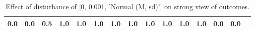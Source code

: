 \begin{table}
\begin{tabular}{l|cc|cc|cc|cc|cc|cc|cc}
\cellcolor{Bittersweet}0.0&\cellcolor{Bittersweet}0.0&0.5&1.0&\cellcolor{Bittersweet}1.0&\cellcolor{Bittersweet}1.0&\cellcolor{Bittersweet}1.0&\cellcolor{Bittersweet}1.0&\cellcolor{Bittersweet}1.0&\cellcolor{Bittersweet}1.0&\cellcolor{Bittersweet}1.0&\cellcolor{Bittersweet}1.0&\cellcolor{Bittersweet}0.0&\cellcolor{Bittersweet}0.0\\\bottomrule\end{tabular}\caption{Effect of disturbance of [0, 0.001, 'Normal (M, sd)'] on strong view of outcomes.}\end{table}